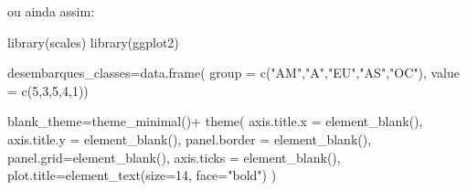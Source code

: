 \documentclass[
]{book}
\newenvironment{Shaded}{\begin{snugshade}}{\end{snugshade}}
\newcommand{\AttributeTok}[1]{\textcolor[rgb]{0.77,0.63,0.00}{#1}}
\newcommand{\DecValTok}[1]{\textcolor[rgb]{0.00,0.00,0.81}{#1}}
\newcommand{\FunctionTok}[1]{\textcolor[rgb]{0.00,0.00,0.00}{#1}}
\newcommand{\NormalTok}[1]{#1}
\newcommand{\OtherTok}[1]{\textcolor[rgb]{0.56,0.35,0.01}{#1}}
\newcommand{\SpecialCharTok}[1]{\textcolor[rgb]{0.00,0.00,0.00}{#1}}
\newcommand{\StringTok}[1]{\textcolor[rgb]{0.31,0.60,0.02}{#1}}
\begin{document}
\hfill\break

ou ainda assim:

\hfill\break

\begin{Shaded}
\begin{Highlighting}[]
\FunctionTok{library}\NormalTok{(scales)}
\FunctionTok{library}\NormalTok{(ggplot2)}

\NormalTok{desembarques\_classes}\OtherTok{=}\FunctionTok{data.frame}\NormalTok{(}
  \AttributeTok{group =} \FunctionTok{c}\NormalTok{(}\StringTok{"AM"}\NormalTok{,}\StringTok{"A"}\NormalTok{,}\StringTok{"EU"}\NormalTok{,}\StringTok{"AS"}\NormalTok{,}\StringTok{"OC"}\NormalTok{),}
  \AttributeTok{value =} \FunctionTok{c}\NormalTok{(}\DecValTok{5}\NormalTok{,}\DecValTok{3}\NormalTok{,}\DecValTok{5}\NormalTok{,}\DecValTok{4}\NormalTok{,}\DecValTok{1}\NormalTok{))}


\NormalTok{blank\_theme}\OtherTok{=}\FunctionTok{theme\_minimal}\NormalTok{()}\SpecialCharTok{+}
  \FunctionTok{theme}\NormalTok{(}
    \AttributeTok{axis.title.x =} \FunctionTok{element\_blank}\NormalTok{(),}
    \AttributeTok{axis.title.y =} \FunctionTok{element\_blank}\NormalTok{(),}
    \AttributeTok{panel.border =} \FunctionTok{element\_blank}\NormalTok{(),}
    \AttributeTok{panel.grid=}\FunctionTok{element\_blank}\NormalTok{(),}
    \AttributeTok{axis.ticks =} \FunctionTok{element\_blank}\NormalTok{(),}
    \AttributeTok{plot.title=}\FunctionTok{element\_text}\NormalTok{(}\AttributeTok{size=}\DecValTok{14}\NormalTok{, }\AttributeTok{face=}\StringTok{"bold"}\NormalTok{)}
\NormalTok{  )}


\end{Highlighting}
\end{Shaded}
\end{document}
